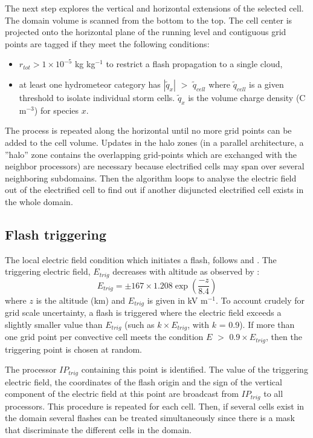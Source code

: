 The next step explores the vertical and horizontal extensions of the selected cell. 
The domain volume is scanned from the bottom to the top. The cell center is projected onto the horizontal plane of the running level and contiguous grid points are tagged if they meet the following conditions:
\begin{itemize}
  \item $r_{tot}>1 \times 10^{-5}$ kg kg$^{-1}$ to restrict a flash propagation to a single cloud,
  \item at least one hydrometeor category has $|\tilde q_x|$ $>$ $\tilde q_{cell}$  where $\tilde q_{cell}$ is a given threshold to isolate individual storm cells. $\tilde q_x$ is the volume charge density (C m$^{-3}$) for species $x$.
\end{itemize}
The process is repeated along the horizontal until no more grid points can be added to the cell volume. 
Updates in the halo zones (in a parallel architecture, a ''halo'' zone contains the overlapping grid-points which are exchanged with the neighbor processors) are necessary because electrified cells may span over several neighboring subdomains.
Then the algorithm loops to analyse the electric field out of the electrified cell to find out if another disjuncted electrified cell exists in the whole domain. 

\subsection{Flash triggering}

The local electric field condition which initiates a flash, follows \citet{MacGorman-2001} and \citet{Barthe-Pinty-2007-flash}. 
The triggering electric field, $E_{trig}$ decreases with altitude as observed by \citet{Marshall-1995}:
\begin{equation}
  E_{trig} = \pm 167 \times 1.208 \exp \left( \frac{-z}{8.4} \right)
\label{eq:trig}
\end{equation}
where $z$ is the altitude (km) and $E_{trig}$ is given in kV m$^{-1}$.
To account crudely for grid scale uncertainty, a flash is triggered where the electric field exceeds a slightly smaller value than $E_{trig}$ (such as $k \times E_{trig}$, with $k$ = 0.9).
If more than one grid point per convective cell meets the condition $E$ $>$ $0.9 \times E_{trig}$, then the triggering point is chosen at random.

The processor $IP_{trig}$ containing this point is identified.
The value of the triggering electric field, the coordinates of the flash origin and the sign of the vertical component of the electric field at this point are broadcast from $IP_{trig}$ to all processors. 
This procedure is repeated for each cell.
Then, if several cells exist in the domain several flashes can be treated simultaneously since there is a mask that discriminate the different cells in the domain.

